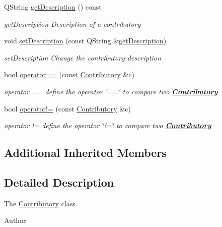 \begin{DoxyCompactItemize}
Q\-String \hyperlink{classModels_1_1Contributory_ae2b936f2fb1ccad2009eae9b5d12fc02}{get\-Description} () const 
\begin{DoxyCompactList}\small\item\em get\-Description Description of a contributory \end{DoxyCompactList}\item 
void \hyperlink{classModels_1_1Contributory_a12d4199fa7175c0b43f62eddf7c3d69e}{set\-Description} (const Q\-String \&\hyperlink{classModels_1_1Contributory_ae2b936f2fb1ccad2009eae9b5d12fc02}{get\-Description})
\begin{DoxyCompactList}\small\item\em set\-Description Change the contributory description \end{DoxyCompactList}\item 
bool \hyperlink{classModels_1_1Contributory_ad49c8b9cdf7254069e07f2238b42c8f3}{operator==} (const \hyperlink{classModels_1_1Contributory}{Contributory} \&c)
\begin{DoxyCompactList}\small\item\em operator == define the operator \char`\"{}==\char`\"{} to compare two {\bfseries \hyperlink{classModels_1_1Contributory}{Contributory}} \end{DoxyCompactList}\item 
bool \hyperlink{classModels_1_1Contributory_a0808e6453b222f62d3288361dcb56d16}{operator!=} (const \hyperlink{classModels_1_1Contributory}{Contributory} \&c)
\begin{DoxyCompactList}\small\item\em operator != define the operator \char`\"{}!=\char`\"{} to compare two {\bfseries \hyperlink{classModels_1_1Contributory}{Contributory}} \end{DoxyCompactList}\end{DoxyCompactItemize}
\subsection*{Additional Inherited Members}


\subsection{Detailed Description}
The \hyperlink{classModels_1_1Contributory}{Contributory} class. 

\begin{DoxyAuthor}{Author}

\end{DoxyAuthor}


